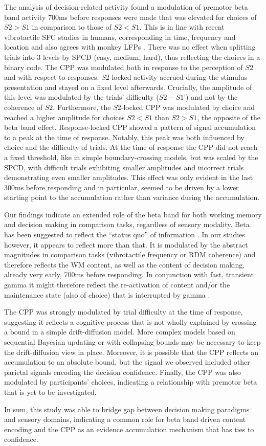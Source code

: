 The analysis of decision-related activity found a modulation of premotor beta band activity 700ms before responses were made that was elevated for choices of $S2>S1$ in comparison to those of $S2<S1$. This is in line with recent vibrotactile SFC studies in humans, corresponding in time, frequency and location \parencite{Herding2016} and also agrees with monkey LFPs \parencite{Haegens2011,Haegens2017}. There was no effect when splitting trials into 3 levels by SPCD (easy, medium, hard), thus reflecting the choices in a binary code. 
The CPP was modulated both in response to the perception of $S2$ and with respect to responses. $S2$-locked activity accrued during the stimulus presentation and stayed on a fixed level afterwards. Crucially, the amplitude of this level was modulated by the trials’ difficulty ($S2-S1’$) and not by the coherence of $S2$. Furthermore, the $S2$-locked CPP was modulated by choice and reached a higher amplitude for choices $S2<S1$ than $S2>S1$, the opposite of the beta band effect. Response-locked CPP showed a pattern of signal accumulation to a peak at the time of response. Notably, this peak was both influenced by choice and the difficulty of trials. At the time of response the CPP did not reach a fixed threshold, like in simple boundary-crossing models, but was scaled by the SPCD, with difficult trials exhibiting smaller amplitudes and incorrect trials demonstrating even smaller amplitudes. This effect was only evident in the last 300ms before responding and in particular, seemed to be driven by a lower starting point to the accumulation rather than variance during the accumulation.

Our findings indicate an extended role of the beta band for both working memory and decision making in comparison tasks, regardless of sensory modality. Beta has been suggested to reflect the “status quo” of information \parencite{Engel2010}. In our studies however, it appears to reflect more than that. It is modulated by the abstract magnitudes in comparison tasks (vibrotactile frequency or RDM coherence) and therefore reflects the WM content, as well as the content of decision making, already very early, 700ms before responding. In conjunction with fast, transient gamma it might therefore reflect the re-activation of content \parencite{Spitzer2017} and/or the maintenance state (also of choice) that is interrupted by gamma \parencite{Lundqvist2018}.

The CPP was strongly modulated by trial difficulty at the time of response, suggesting it reflects a cognitive process that is not wholly explained by crossing a bound in a simple drift-diffusion model. More complex models based on sequential Bayesian updating or with collapsing bounds may be necessary to keep the drift-diffusion view in place. Moreover, it is possible that the CPP reflects an accumulation to an absolute bound, but the signal we observed included other parietal signals encoding the decision confidence. Finally, the CPP was also modulated by participants' choices, indicating a relationship with premotor beta that is yet to be investigated.

In sum, this study was able to bridge gap between decision making paradigms and sensory domains, indicating a common role for beta band driven content encoding and the CPP as an evidence accumulation mechanism that has ties to confidence.
